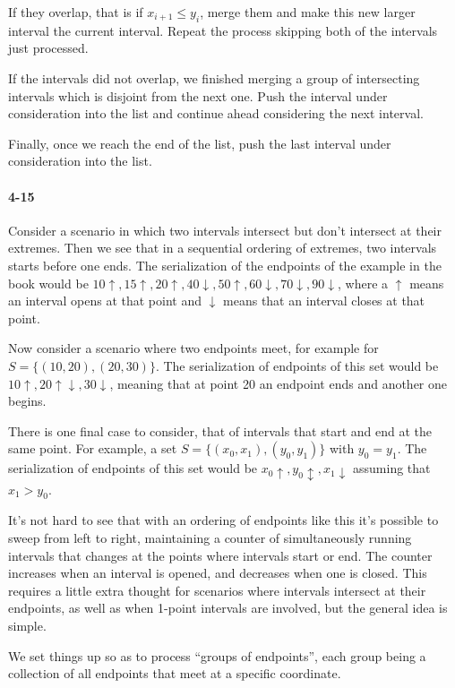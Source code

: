 \documentclass{report}
\begin{document}
If they overlap, that is if $x_{i+1} \le y_i$, merge them and make this new larger interval the current interval. Repeat the process skipping both of the intervals just processed.

If the intervals did not overlap, we finished merging a group of intersecting intervals which is disjoint from the next one. Push the interval under consideration into the list and continue ahead considering the next interval.

Finally, once we reach the end of the list, push the last interval under consideration into the list.

\paragraph{4-15} Consider a scenario in which two intervals intersect but don't intersect at their extremes. Then we see that in a sequential ordering of extremes, two intervals starts before one ends. The serialization of the endpoints of the example in the book would be $10\uparrow,15\uparrow,20\uparrow,40\downarrow,50\uparrow,60\downarrow,70\downarrow,90\downarrow$, where a $\uparrow$ means an interval opens at that point and $\downarrow$ means that an interval closes at that point.

Now consider a scenario where two endpoints meet, for example for $S=\{(10,20),(20,30)\}$. The serialization of endpoints of this set would be $10\uparrow,20\uparrow\downarrow,30\downarrow$, meaning that at point 20 an endpoint ends and another one begins.

There is one final case to consider, that of intervals that start and end at the same point. For example, a set $S=\{(x_0, x_1), (y_0, y_1)\}$ with $y_0=y_1$. The serialization of endpoints of this set would be $x_0\uparrow, y_0\updownarrow, x_1\downarrow$ assuming that $x_1 > y_0$.

It's not hard to see that with an ordering of endpoints like this it's possible to sweep from left to right, maintaining a counter of simultaneously running intervals that changes at the points where intervals start or end. The counter increases when an interval is opened, and decreases when one is closed. This requires a little extra thought for scenarios where intervals intersect at their endpoints, as well as when 1-point intervals are involved, but the general idea is simple.

We set things up so as to process ``groups of endpoints'', each group being a collection of all endpoints that meet at a specific coordinate.
\end{document}
